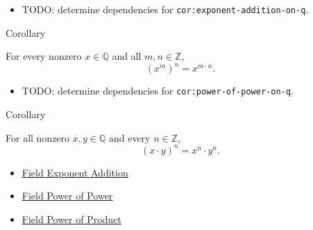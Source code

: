 \begin{dependencies}
\begin{itemize}
  \item TODO: determine dependencies for \texttt{cor:exponent-addition-on-q}.
\end{itemize}
\end{dependencies}

\begin{corollarybox}{Corollary}
\begin{corollary}
\label{cor:power-of-power-on-q}
For every nonzero $x\in\mathbb{Q}$ and all $m,n\in\mathbb{Z}$,
\[
(x^m)^n=x^{m\cdot n}.
\]
\end{corollary}
\end{corollarybox}

\begin{dependencies}
\begin{itemize}
  \item TODO: determine dependencies for \texttt{cor:power-of-power-on-q}.
\end{itemize}
\end{dependencies}

\begin{corollarybox}{Corollary}
\begin{corollary}
\label{cor:power-of-product-on-q}
For all nonzero $x,y\in\mathbb{Q}$ and every $n\in\mathbb{Z}$,
\[
(x\cdot y)^n=x^n\cdot y^n.
\]
\end{corollary}
\end{corollarybox}

\begin{dependencies}
\begin{itemize}
  \item \hyperref[thm:field-exponent-addition]{Field Exponent Addition}
  \item \hyperref[thm:field-power-of-power]{Field Power of Power}
  \item \hyperref[thm:field-power-of-product]{Field Power of Product}
\end{itemize}
\end{dependencies}
